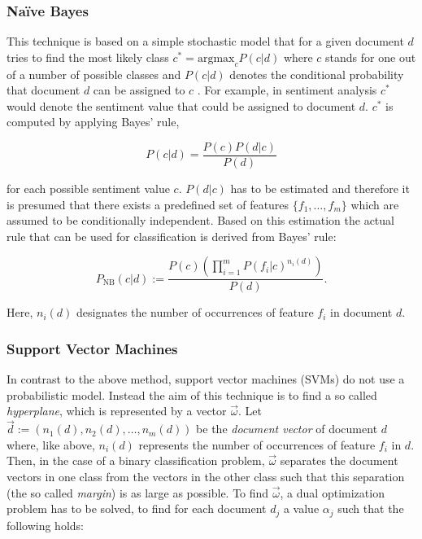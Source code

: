 \subsubsection*{Na\"ive Bayes}

This technique is based on a simple stochastic model that for a given document $d$ tries to find the most likely class $c^* = \mathrm{arg max}_c P(c \vert d)$ where $c$ stands for one out of a number of possible classes and $P(c \vert d)$ denotes the conditional probability that document $d$ can be assigned to $c$ \cite{Pang2002}. For example, in sentiment analysis $c^*$ would denote the sentiment value that could be assigned to document $d$. $c^*$ is computed by applying Bayes' rule,

\begin{equation*}
P(c \vert d) = \frac{P(c)P(d \vert c)}{P(d)}
\end{equation*}

for each possible sentiment value $c$. $P(d \vert c)$ has to be estimated and therefore it is presumed that there exists a predefined set of features $\lbrace f_1, \ldots , f_m \rbrace$ which are assumed to be conditionally independent. Based on this estimation the actual rule that can be used for classification is derived from Bayes' rule:

\begin{equation*}
P_{\mathrm{NB}}(c \vert d) := \frac{P(c)(\prod^{m}_{i=1}P(f_i \vert c)^{n_i(d)})}{P(d)}.
\end{equation*}

Here, $n_i(d)$ designates the number of occurrences of feature $f_i$ in document $d$.

\subsubsection*{Support Vector Machines}

In contrast to the above method, support vector machines (SVMs) do not use a probabilistic model. Instead the aim of this technique is to find a so called \emph{hyperplane}, which is represented by a vector $\vec{\omega}$. Let $\vec{d} := (n_1(d), n_2(d),\ldots , n_m(d))$ be the \emph{document vector} of document $d$ where, like above, $n_i(d)$ represents the number of occurrences of feature $f_i$ in $d$. Then, in the case of a binary classification problem, $\vec{\omega}$ separates the document vectors in one class from the vectors in the other class such that this separation (the so called \emph{margin}) is as large as possible. To find $\vec{\omega}$, a dual optimization problem has to be solved, to find for each document $d_j$ a value $\alpha_j$ such that the following holds:

